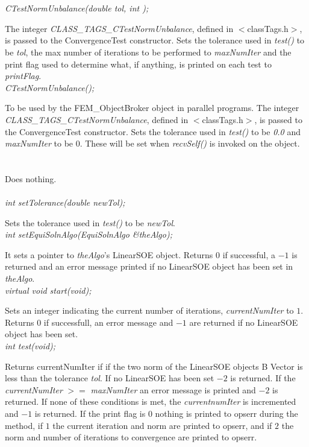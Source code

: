   \\
  \\ 
{\em CTestNormUnbalance(double tol, int );}  

The integer {\em CLASS\_TAGS\_CTestNormUnbalance}, defined in
$<$classTags.h$>$, is passed to the ConvergenceTest constructor. 
Sets the tolerance used in {\em test()} to be {\em tol}, the max
number of iterations to be performed to {\em maxNumIter} and the print
flag used to determine what, if anything, is printed on each test to
{\em printFlag}. \\

{\em CTestNormUnbalance();}  

To be used by the FEM\_ObjectBroker object in parallel programs. The
integer {\em CLASS\_TAGS\_CTestNormUnbalance}, defined in
$<$classTags.h$>$, is passed to the ConvergenceTest constructor. Sets
the tolerance used in {\em test()} to be {\em 0.0} and {\em maxNumIter} 
to be $0$. These will be set when {\em recvSelf()} is invoked on the object. \\

 \\
 \\ 
Does nothing. \\

  \\
{\em int setTolerance(double newTol);} 

Sets the tolerance used in {\em test()} to be {\em newTol}. \\

{\em int setEquiSolnAlgo(EquiSolnAlgo \&theAlgo);} 

It sets a pointer to {\em theAlgo}'s LinearSOE object. Returns $0$ if
successful, a $-1$ is returned and an error message printed if no
LinearSOE object has been set in {\em theAlgo}. \\

{\em virtual void start(void);} 

Sets an integer indicating the current number of iterations, {\em
currentNumIter} to $1$. Returns $0$ if successfull, an error message
and $-1$ are returned if no LinearSOE object has been set. \\ 

{\em int test(void);} 

Returns {currentNumIter} if if the two norm of the LinearSOE objects B
Vector is less than the tolerance {\em tol}. If no LinearSOE has been
set $-2$ is returned. If the {\em currentNumIter} $>=$ {\em
maxNumIter} an error message is printed and $-2$ is returned. If none
of these conditions is met, the {\em currentnumIter} is incremented 
and $-1$ is returned. If the print flag is $0$ nothing is printed to
opserr during the method, if $1$ the current iteration and norm are
printed to opserr, and if $2$ the norm and number of iterations to convergence
are printed to opserr. \\ 


